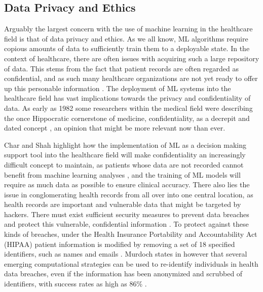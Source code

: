 \documentclass[12pt]{article}
\begin{document}
\vspace{-5mm}
\subsection{Data Privacy and Ethics}

Arguably the largest concern with the use of machine learning in the healthcare field is that of data privacy and ethics. As we all know, ML algorithms require copious amounts of data to sufficiently train them to a deployable state. In the context of healthcare, there are often issues with acquiring such a large repository of data. This stems from the fact that patient records are often regarded as confidential, and as such many healthcare organizations are not yet ready to offer up this personable information \citep{Khan_2023}. The deployment of ML systems into the healthcare field has vast implications towards the privacy and confidentiality of data. As early as 1982 some researchers within the medical field were describing the once Hippocratic cornerstone of medicine, confidentiality, as a decrepit and dated concept \citep{Siegler_1982}, an opinion that might be more relevant now than ever.\

Char and Shah highlight how the implementation of ML as a decision making support tool into the healthcare field will make confidentiality an increasingly difficult concept to maintain, as patients whose data are not recorded cannot benefit from machine learning analyses \citep{Char_2018}, and the training of ML models will require as much data as possible to ensure clinical accuracy. There also lies the issue in conglomerating health records from all over into one central location, as health records are important and vulnerable data that might be targeted by hackers. There must exist sufficient security measures to prevent data breaches and protect this vulnerable, confidential information \citep{Khan_2023,Ali_2023}. To protect against these kinds of breaches, under the Health Insurance Portability and Accountability Act (HIPAA) patient information is modified by removing a set of 18 specified identifiers, such as names and emails \citep{Price_2019}. Murdoch states in \citep{Murdoch_2021} however that several emerging computational strategies can be used to re-identify individuals in health data breaches, even if the information has been anonymized and scrubbed of identifiers, with success rates as high as 86\% \citep{Murdoch_2021,Check_Hayden_2013,Gymrek_2013,Erlich_2018,Ji_2019}.  \

\end{document}

